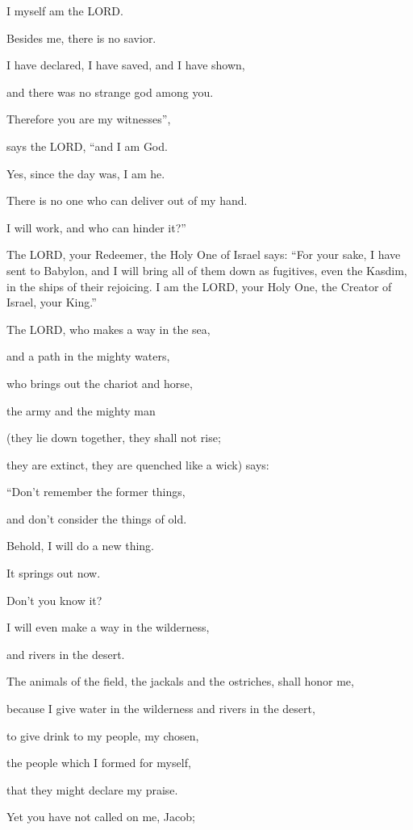 \myverse{}I myself am the LORD.

Besides me, there is no savior.

\myverse{}I have declared, I have saved, and I have shown,

and there was no strange god among you.

Therefore you are my witnesses”,

says the LORD, “and I am God.

\myverse{}Yes, since the day was, I am he.

There is no one who can deliver out of my hand.

I will work, and who can hinder it?”

\myverse{}The LORD, your Redeemer, the Holy One of Israel says: “For your
sake, I have sent to Babylon, and I will bring all of them down as fugitives, even the Kasdim, in the
ships of their rejoicing.
\myverse{}I am the LORD, your Holy One, the Creator of Israel, your King.”

\myverse{}The LORD, who makes a way in the sea,

and a path in the mighty waters,

\myverse{}who brings out the chariot and horse,

the army and the mighty man

(they lie down together, they shall not rise;

they are extinct, they are quenched like a wick) says:

\myverse{}“Don’t remember the former things,

and don’t consider the things of old.

\myverse{}Behold, I will do a new thing.

It springs out now.

Don’t you know it?

I will even make a way in the wilderness,

and rivers in the desert.

\myverse{}The animals of the field, the jackals and the ostriches, shall
honor me,

because I give water in the wilderness and rivers in the desert,

to give drink to my people, my chosen,

\myverse{}the people which I formed for myself,

that they might declare my praise.


\vspace{\baselineskip} \myverse{}Yet you have not called on me, Jacob;

